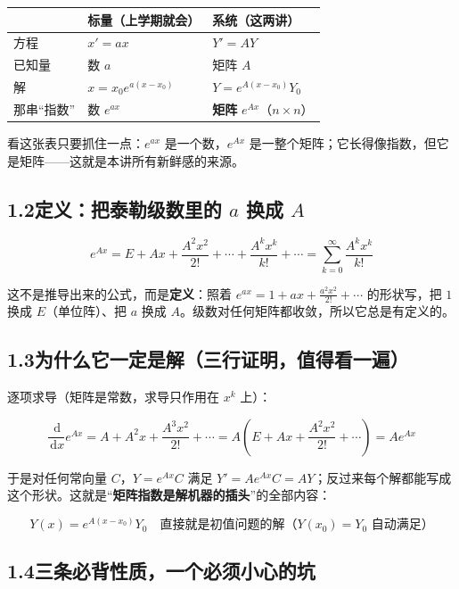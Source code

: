 \documentclass[11pt]{ctexart}
\newcommand{\dd}{\,\mathrm{d}}
\begin{document}
\begin{center}
\small
\begin{tabular}{|>{\raggedright\arraybackslash}p{3.4cm}|>{\raggedright\arraybackslash}p{5.2cm}|>{\raggedright\arraybackslash}p{6.2cm}|}
\hline
& \textbf{标量（上学期就会）} & \textbf{系统（这两讲）} \\ \hline
方程 & $x'=ax$ & $Y'=AY$ \\ \hline
已知量 & 数 $a$ & 矩阵 $A$ \\ \hline
解 & $x=x_0e^{a(x-x_0)}$ & $Y=e^{A(x-x_0)}Y_0$ \\ \hline
那串“指数” & 数 $e^{ax}$ & \textbf{矩阵} $e^{Ax}$（$n\times n$） \\ \hline
\end{tabular}
\end{center}

看这张表只要抓住一点：$e^{ax}$ 是一个数，$e^{Ax}$ 是一整个矩阵；它长得像指数，但它是矩阵——这就是本讲所有新鲜感的来源。

\subsection*{1.2\quad 定义：把泰勒级数里的 $a$ 换成 $A$}

\[
e^{Ax}=E+Ax+\frac{A^2x^2}{2!}+\cdots+\frac{A^kx^k}{k!}+\cdots=\sum_{k=0}^{\infty}\frac{A^kx^k}{k!}
\]

这不是推导出来的公式，而是\textbf{定义}：照着 $e^{ax}=1+ax+\frac{a^2x^2}{2!}+\cdots$ 的形状写，把 $1$ 换成 $E$（单位阵）、把 $a$ 换成 $A$。级数对任何矩阵都收敛，所以它总是有定义的。

\subsection*{1.3\quad 为什么它一定是解（三行证明，值得看一遍）}

逐项求导（矩阵是常数，求导只作用在 $x^k$ 上）：

\[
\frac{\dd}{\dd x}e^{Ax}=A+A^2x+\frac{A^3x^2}{2!}+\cdots=A\left(E+Ax+\frac{A^2x^2}{2!}+\cdots\right)=Ae^{Ax}
\]

于是对任何常向量 $C$，$Y=e^{Ax}C$ 满足 $Y'=Ae^{Ax}C=AY$；反过来每个解都能写成这个形状。这就是“\textbf{矩阵指数是解机器的插头}”的全部内容：

\[
Y(x)=e^{A(x-x_0)}Y_0 \quad\text{直接就是初值问题的解（}Y(x_0)=Y_0\text{ 自动满足）}
\]

\subsection*{1.4\quad 三条必背性质，一个必须小心的坑}
\end{document}
